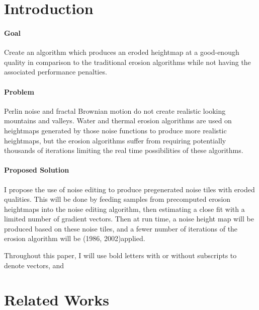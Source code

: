 \documentclass[12pt]{article}
\theoremstyle{definition}
\theoremstyle{remark}
\begin{document}
\maketitle

\singlespacing
\section{Introduction}
\doublespacing

\paragraph{Goal}

Create an algorithm which produces an eroded heightmap at a good-enough quality in comparison to the traditional erosion algorithms while not having the associated performance penalties.

\paragraph{Problem}

Perlin noise and fractal Brownian motion do not create realistic looking mountains and valleys. Water and thermal erosion algorithms are used on heightmaps generated by those noise functions to produce more realistic heightmaps, but the erosion algorithms suffer from requiring potentially thousands of iterations limiting the real time possibilities of these algorithms.

\paragraph{Proposed Solution}

I propose the use of noise editing to produce pregenerated noise tiles with eroded qualities. This will be done by feeding samples from precomputed erosion heightmaps into the noise editing algorithm, then estimating a close fit with a limited number of gradient vectors. Then at run time, a noise height map will be produced based on these noise tiles, and a fewer number of iterations of the erosion algorithm will be (1986, 2002)applied.

Throughout this paper, I will use bold letters with or without subscripts to denote vectors, and 

\singlespacing
\section{Related Works}
\doublespacing
\end{document}
